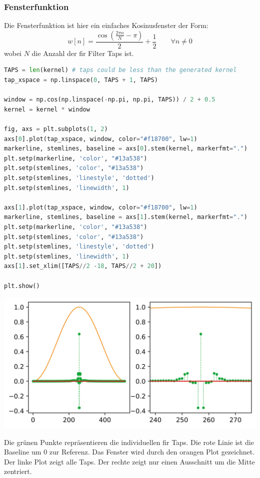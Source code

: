 \hypertarget{fensterfunktion}{%
\subsubsection{Fensterfunktion}\label{fensterfunktion}}

Die Fensterfunktion ist hier ein einfaches Kosinusfenster der Form:
\[w[n] = \frac{\cos \left( \frac{2\pi n}{N}-\pi \right)}{2} + \frac{1}{2} \qquad \forall n \neq 0\]
wobei \(N\) die Anzahl der \gls{fir} Filter Taps ist.

\begin{lstlisting}[language=Python]
TAPS = len(kernel) # taps could be less than the generated kernel
tap_xspace = np.linspace(0, TAPS + 1, TAPS)

window = np.cos(np.linspace(-np.pi, np.pi, TAPS)) / 2 + 0.5
kernel = kernel * window

fig, axs = plt.subplots(1, 2)
axs[0].plot(tap_xspace, window, color="#f18700", lw=1)
markerline, stemlines, baseline = axs[0].stem(kernel, markerfmt=".")
plt.setp(markerline, 'color', "#13a538")
plt.setp(stemlines, 'color', "#13a538")
plt.setp(stemlines, 'linestyle', 'dotted')
plt.setp(stemlines, 'linewidth', 1)

axs[1].plot(tap_xspace, window, color="#f18700", lw=1)
markerline, stemlines, baseline = axs[1].stem(kernel, markerfmt=".")
plt.setp(markerline, 'color', "#13a538")
plt.setp(stemlines, 'color', "#13a538")
plt.setp(stemlines, 'linestyle', 'dotted')
plt.setp(stemlines, 'linewidth', 1)
axs[1].set_xlim([TAPS//2 -18, TAPS//2 + 20])

plt.show()
\end{lstlisting}

\includegraphics{./img/ce1bcfcc09df6843eca007d841c83f231c4e8479.png}

Die grünen Punkte repräsentieren die individuellen \gls{fir} Taps. Die
rote Linie ist die Baseline um 0 zur Referenz. Das Fenster wird durch
den orangen Plot gezeichnet. Der linke Plot zeigt alle Taps. Der rechte
zeigt nur einen Ausschnitt um die Mitte zentriert.

